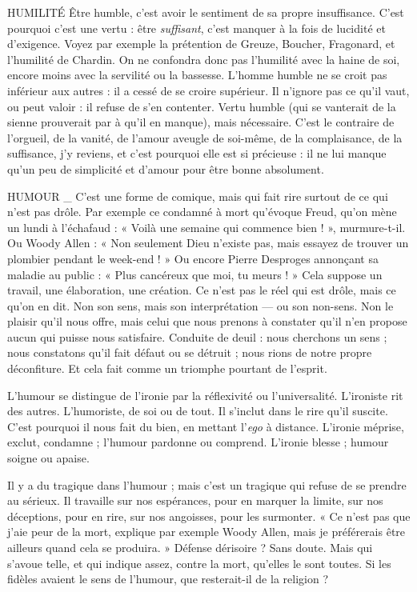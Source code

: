 HUMILITÉ Être humble, c’est avoir le sentiment de sa propre insuffisance.
C’est pourquoi c’est une vertu : être {\it suffisant}, c'est manquer à
la fois de lucidité et d’exigence. Voyez par exemple la prétention de Greuze,
Boucher, Fragonard, et l'humilité de Chardin. On ne confondra donc pas
l’humilité avec la haine de soi, encore moins avec la servilité ou la bassesse.
L’homme humble ne se croit pas inférieur aux autres : il a cessé de se croire
supérieur. Il n’ignore pas ce qu’il vaut, ou peut valoir : il refuse de s’en
contenter. Vertu humble (qui se vanterait de la sienne prouverait par à qu’il en
manque), mais nécessaire. C’est le contraire de l’orgueil, de la vanité, de
l’amour aveugle de soi-même, de la complaisance, de la suffisance, j'y reviens,
et c'est pourquoi elle est si précieuse : il ne lui manque qu’un peu de simplicité
et d’amour pour être bonne absolument.

HUMOUR _ C'est une forme de comique, mais qui fait rire surtout de ce qui
n'est pas drôle. Par exemple ce condamné à mort qu’évoque
Freud, qu’on mène un lundi à l’échafaud : « Voilà une semaine qui commence
bien ! », murmure-t-il. Ou Woody Allen : « Non seulement Dieu n'existe pas,
mais essayez de trouver un plombier pendant le week-end ! » Ou encore Pierre
Desproges annonçant sa maladie au public : « Plus cancéreux que moi, tu
meurs ! » Cela suppose un travail, une élaboration, une création. Ce n’est pas le
réel qui est drôle, mais ce qu’on en dit. Non son sens, mais son interprétation
— ou son non-sens. Non le plaisir qu’il nous offre, mais celui que nous prenons
à constater qu’il n’en propose aucun qui puisse nous satisfaire. Conduite de
deuil : nous cherchons un sens ; nous constatons qu’il fait défaut ou se détruit ;
nous rions de notre propre déconfiture. Et cela fait comme un triomphe pourtant
de l'esprit.

L'humour se distingue de l'ironie par la réflexivité ou l’universalité. L’ironiste
rit des autres. L’humoriste, de soi ou de tout. Il s’inclut dans le rire qu’il
suscite. C’est pourquoi il nous fait du bien, en mettant l’{\it ego} à distance. L’ironie
méprise, exclut, condamne ; l’humour pardonne ou comprend. L’ironie blesse ;
humour soigne ou apaise.

Il y a du tragique dans l’humour ; mais c’est un tragique qui refuse de se
prendre au sérieux. Il travaille sur nos espérances, pour en marquer la limite,
sur nos déceptions, pour en rire, sur nos angoisses, pour les surmonter. « Ce
n’est pas que j'aie peur de la mort, explique par exemple Woody Allen, mais je
préférerais être ailleurs quand cela se produira. » Défense dérisoire ? Sans doute.
Mais qui s’avoue telle, et qui indique assez, contre la mort, qu’elles le sont
toutes. Si les fidèles avaient le sens de l'humour, que resterait-il de la religion ?

